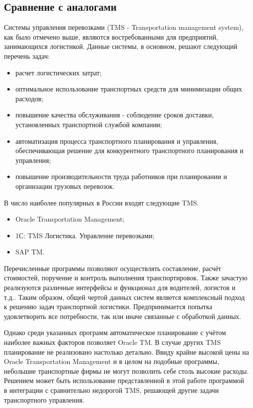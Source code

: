 \subsection{Сравнение с аналогами}
	Системы управления перевозками (TMS - Transportation management system), как было отмечено выше, являются востребованными для предприятий, занимающихся логистикой. Данные системы, в основном, решают следующий перечень задач\cite{subj:tms_cmp}:
	\begin{itemize}
		\item расчет логистических затрат;
		\item оптимальное использование транспортных средств для минимизации
		общих расходов;
		\item повышение качества обслуживания - соблюдение сроков доставки, установленных транспортной службой компании;
		\item автоматизация процесса транспортного планирования и управления,
		обеспечивающая решение для конкурентного транспортного планирования
		и управления;
		\item повышение производительности труда работников при планировании и
		организации грузовых перевозок.
	\end{itemize}

	В число наиболее популярных в России входят следующие TMS.
	\begin{itemize}
		\item Oracle Transportation Management;
		\item 1С: TMS Логистика. Управление перевозками;
		\item SAP TM.
	\end{itemize}

	Перечисленные программы позволяют осуществлять составление, расчёт стоимостей, поручение и контроль выполнения транспортировок. Также зачастую реализуются различные интерфейсы и функционал для водителей, логистов и т.д.. Таким образом, общей чертой данных систем является комплексный подход к решению задач транспортной логистики. Предпринимается попытка удовлетворить все потребности, так или иначе связанные с обработкой данных.   
	
	Однако среди указанных программ автоматическое планирование с учётом наиболее важных факторов позволяет Oracle TM. В случае других TMS планирование не реализовано настолько детально. Ввиду крайне высокой цены\cite{subj:tms_cmp} на Oracle Transportation Management и в целом на подобные программы, небольшие транспортные фирмы не могут позволить себе столь высокие расходы. Решением может быть использование представленной в этой работе программой в интеграции с сравнительно недорогой TMS, решающей другие задачи транспортного управления.
	

